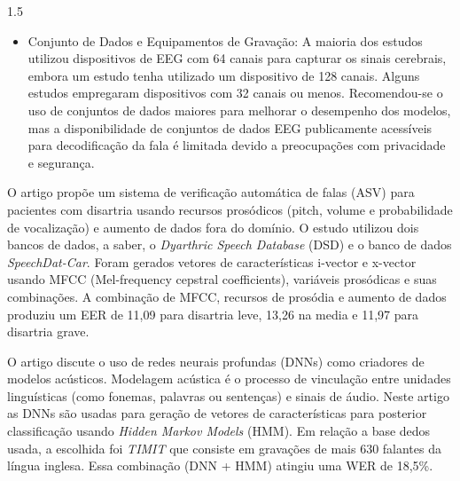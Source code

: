 \documentclass[a4paper,12pt,openright,oneside]{book}
\newenvironment{myenv}[1]
  {\begin{spacing}{#1}}
  {\end{spacing}}
\begin{document}
\begin{myenv}{1.5}
\begin{itemize}
				\item Conjunto de Dados e Equipamentos de Gravação: A maioria dos estudos utilizou dispositivos de EEG com 64 canais para capturar os sinais cerebrais, embora um estudo tenha utilizado um dispositivo de 128 canais. Alguns estudos empregaram dispositivos com 32 canais ou menos. Recomendou-se o uso de conjuntos de dados maiores para melhorar o desempenho dos modelos, mas a disponibilidade de conjuntos de dados EEG publicamente acessíveis para decodificação da fala é limitada devido a preocupações com privacidade e segurança.
			\end{itemize}

			\par O artigo \cite{salim2023automatic} propõe um sistema de verificação automática de falas (ASV) para pacientes com disartria usando recursos prosódicos (pitch, volume e probabilidade de vocalização) e aumento de dados fora do domínio. O estudo utilizou dois bancos de dados, a saber, o \textit{Dyarthric Speech Database} (DSD) e o banco de dados \textit{SpeechDat-Car}. Foram gerados vetores de características i-vector e x-vector usando MFCC (Mel-frequency cepstral coefficients), variáveis prosódicas e suas combinações. A combinação de MFCC, recursos de prosódia e aumento de dados produziu um EER de 11,09 para disartria leve, 13,26 na media e 11,97 para disartria grave.\newline

			\par O artigo \cite{6296526} discute o uso de redes neurais profundas (DNNs) como criadores de modelos acústicos. Modelagem acústica é o processo de vinculação entre unidades linguísticas (como fonemas, palavras ou sentenças) e sinais de áudio. Neste artigo as DNNs são usadas para geração de vetores de características para posterior classificação usando \textit{Hidden Markov Models} (HMM). Em relação a base dedos usada, a escolhida foi \textit{TIMIT} que consiste em gravações de mais 630 falantes da língua inglesa. Essa combinação (DNN + HMM) atingiu uma WER de 18,5\%.\newline
			

\end{myenv}
\end{document}
